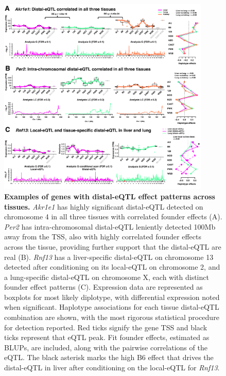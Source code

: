\documentclass[9pt,twocolumn,twoside]{gsajnl}
\begin{document}
\begin{figure}[h!]
\renewcommand{\familydefault}{\sfdefault}\normalfont
\centering
\includegraphics[width=0.9\textwidth, trim={0in 0in 0in 0in}, clip]{figs/correlated_distal_eqtl.pdf}
\caption{\textbf{Examples of genes with distal-eQTL effect patterns across tissues.} \textit{Akr1e1} has highly significant distal-eQTL detected on chromosome 4 in all three tissues with correlated founder effects (A). \textit{Per2} has intra-chromosomal distal-eQTL leniently detected 100Mb away from the TSS, also with highly correlated founder effects across the tissue, providing further support that the distal-eQTL are real (B). \textit{Rnf13} has a liver-specific distal-eQTL on chromosome 13 detected after conditioning on its local-eQTL on chromosome 2, and a lung-specific distal-eQTL on chromosome X, each with distinct founder effect patterns (C). Expression data are represented as boxplots for most likely diplotype, with differential expression noted when significant. Haplotype associations for each tissue distal-eQTL combination are shown, with the most rigorous statistical procedure for detection reported. Red ticks signify the gene TSS and black ticks represent that eQTL peak. Fit founder effects, estimated as BLUPs, are included, along with the pairwise correlations of the eQTL. The black asterisk marks the high B6 effect that drives the distal-eQTL in liver after conditioning on the local-eQTL for \textit{Rnf13}.
\label{fig:correlated_distal_eqtl}}
\end{figure}
\end{document}
